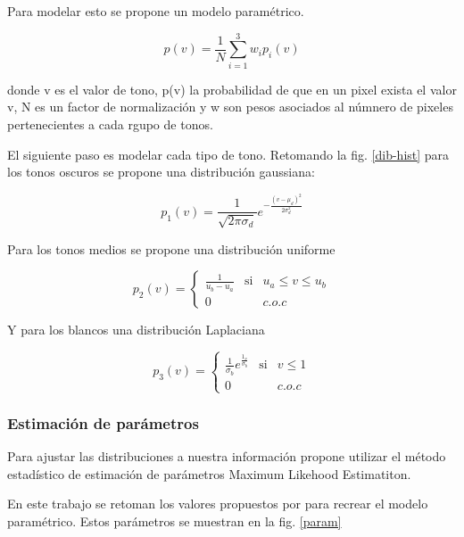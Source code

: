 \documentclass[letterpaper, 10 pt, conference]{ieeeconf}  %
\begin{document}
Para modelar esto se propone un modelo paramétrico.


\begin{equation} \label{mod}
p(v)= \frac{1}{N} \sum_{i=1}^{3} w_{i}p_{i}(v)
\end{equation}

donde v es el valor de tono, p(v) la probabilidad de que en un pixel exista el valor v, N es un factor de normalización y w son pesos asociados al númnero de pixeles pertenecientes a cada rgupo de tonos.

El siguiente paso es modelar cada tipo de tono. Retomando la fig. \ref{dib-hist} para los tonos oscuros se propone una distribución gaussiana:

\begin{equation} \label{pa1}
p_{1}(v)= \frac{1}{\sqrt{2\pi\sigma_{d}}} e^{-\frac{(v-\mu_{d})^{2}}{2\sigma_{d}^{2}}    }  
\end{equation}

Para los tonos medios se propone una distribución uniforme

\begin{equation} \label{pa2}
p_{2}(v)= \left\{ \begin{array}{rcl}
\frac{1}{u_{b} - u_{a} }     & \mbox{si}
& u_{a} \leq v \leq u_{b} \\ 0 &  & c.o.c
\end{array}\right.
\end{equation}

Y para los blancos una distribución Laplaciana

\begin{equation} \label{pa}
p_{3}(v)= \left\{ \begin{array}{rcl}
\frac{1}{\sigma_{b}}e^{\frac{1_v}{\sigma_{b}}}     & \mbox{si}
& v \leq 1 \\ 0  &  & c.o.c
\end{array}\right.
\end{equation}



\subsubsection{Estimación de parámetros}
Para ajustar las distribuciones a nuestra información \cite{lu} propone utilizar el método estadístico de estimación de parámetros Maximum Likehood Estimatiton.

En este trabajo se retoman los valores propuestos por \cite{lu} para recrear el modelo paramétrico. Estos parámetros se muestran en la fig. \ref{param}
\end{document}
